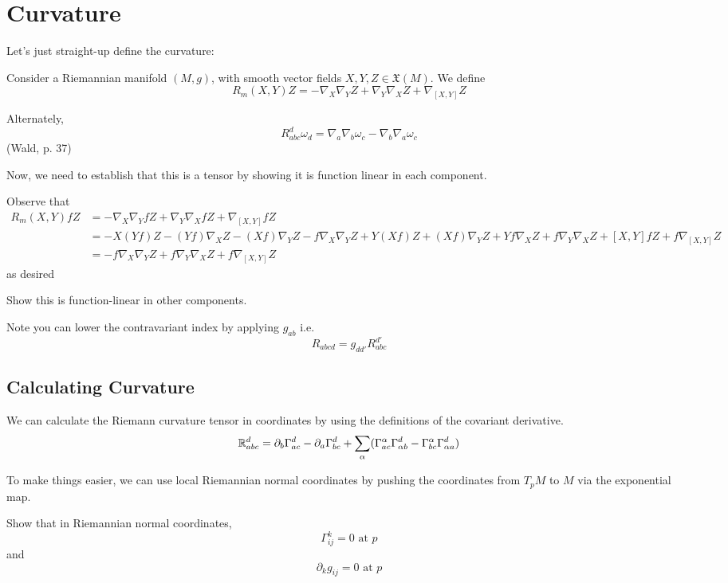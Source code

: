 \documentclass[../main.tex]{subfiles}
\begin{document}
\section{Curvature}

Let's just straight-up define the curvature: 

\begin{defn}
    Consider a Riemannian manifold $(M,g)$, with smooth vector fields
    $X,Y,Z\in\mathfrak{X}(M)$. We define
    \[
        R_m(X,Y)Z = -\nabla_X\nabla_YZ + \nabla_Y\nabla_XZ+\nabla_{[X,Y]}Z
    \]

    Alternately,
    \[
        R_{abc}^d\omega_d = \nabla_a\nabla_b\omega_c -
        \nabla_b\nabla_a\omega_c
    \]
    (Wald, p. 37)
\end{defn}

Now, we need to establish that this is a tensor by showing it is function linear
in each component.

Observe that
\[
    \begin{aligned}
        R_m(X,Y)fZ &= -\nabla_X\nabla_YfZ  + \nabla_Y\nabla_XfZ +
        \nabla_{[X,Y]}fZ\\
        &= -X(Yf)Z - (Yf)\nabla_XZ - (Xf)\nabla_YZ - f\nabla_X\nabla_YZ + Y(Xf)Z
        + (Xf)\nabla_YZ + Yf\nabla_XZ +f\nabla_Y\nabla_XZ + [X,Y]fZ +
        f\nabla_{[X,Y]}Z\\
        &= -f\nabla_X\nabla_YZ + f\nabla_Y\nabla_XZ + f\nabla_{[X,Y]}Z
    \end{aligned}
\]
as desired
\begin{hw}
    Show this is function-linear in other components.
\end{hw}

Note you can lower the contravariant index by applying $g_{ab}$ i.e.
\[
    R_{abcd} = g_{dd'}R_{abc}^{d'}
\]

\subsection*{Calculating Curvature}

We can calculate the Riemann curvature tensor in coordinates by using the
definitions of the covariant derivative.
\[
    \mathbb{R}_{abc}^d = \partial_b\Gamma^d_{ac} - \partial_a\Gamma^d_{bc}
    +\sum_{\alpha} (\Gamma^{\alpha}_{ac}\Gamma^d_{\alpha b} -
    \Gamma^{\alpha}_{bc}\Gamma^d_{\alpha a})
\]

To make things easier, we can use local Riemannian normal coordinates by pushing
the coordinates from $T_pM$ to $M$ via the exponential map.
\begin{hw}
    Show that in Riemannian normal coordinates,
    \[
        \Gamma^k_{ij} = 0 \text{ at }p
    \]
    and
    \[
        \partial_kg_{ij} = 0 \text{ at }p
    \]
\end{hw}
\end{document}
